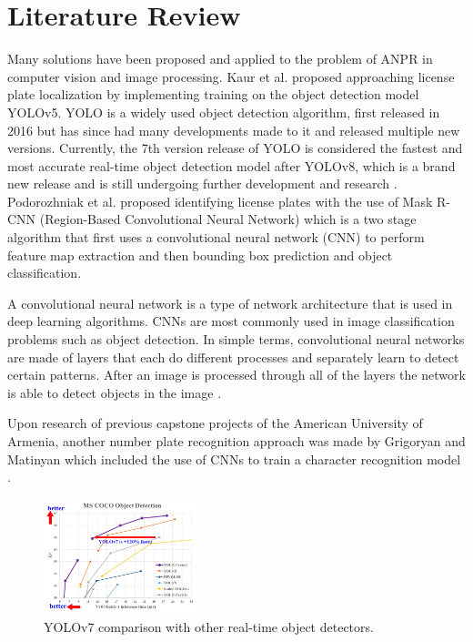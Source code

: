 \documentclass[conference]{IEEEtran}
\begin{document}
\section{Literature Review}

Many solutions have been proposed and applied to the problem of ANPR in computer vision and image processing. 
Kaur et al. \cite{b2} proposed approaching license plate localization by implementing training on the object detection model YOLOv5. 
YOLO is a widely used object detection algorithm, first released in 2016 but has since had many developments made to it and released multiple new versions.
Currently, the 7th version release of YOLO is considered the fastest and most accurate real-time object detection model after YOLOv8, which is a brand new release and is still undergoing further development and research \cite{b3}. 
Podorozhniak et al. \cite{b4} proposed identifying license plates with the use of Mask R-CNN (Region-Based Convolutional Neural Network) which is a two stage algorithm that first uses a convolutional neural network (CNN) to perform feature map extraction and then bounding box prediction and object classification.

A convolutional neural network is a type of network architecture that is used in deep learning algorithms. CNNs are most commonly used in image classification problems such as object detection. In simple terms, convolutional neural networks are made of layers that each do different processes and separately learn to detect certain patterns. After an image is processed through all of the layers the network is able to detect objects in the image \cite{b5}. 

Upon research of previous capstone projects of the American University of Armenia, another number plate recognition approach was made by Grigoryan and Matinyan which included the use of CNNs to train a character recognition model \cite{b23}.

\begin{figure}[h]
    \centering
    \includegraphics[width=0.4\textwidth]{images/Picture2.png}
    \caption{YOLOv7 comparison with other real-time object detectors. \cite{b6}}
    \label{fig:Picture2}
\end{figure}
\end{document}
